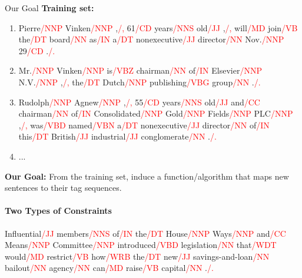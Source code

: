 Our Goal
  \textbf{Training set:}
  \begin{enumerate}
    \item Pierre\textcolor{red}{/NNP} Vinken\textcolor{red}{/NNP} ,\textcolor{red}{/,} 61\textcolor{red}{/CD} years\textcolor{red}{/NNS} old\textcolor{red}{/JJ} ,\textcolor{red}{/,} will\textcolor{red}{/MD} join\textcolor{red}{/VB} the\textcolor{red}{/DT} board\textcolor{red}{/NN} as\textcolor{red}{/IN} a\textcolor{red}{/DT} nonexecutive\textcolor{red}{/JJ} director\textcolor{red}{/NN} Nov.\textcolor{red}{/NNP} 29\textcolor{red}{/CD} .\textcolor{red}{/.}
    \item Mr.\textcolor{red}{/NNP} Vinken\textcolor{red}{/NNP} is\textcolor{red}{/VBZ} chairman\textcolor{red}{/NN} of\textcolor{red}{/IN} Elsevier\textcolor{red}{/NNP} N.V.\textcolor{red}{/NNP} ,\textcolor{red}{/,} the\textcolor{red}{/DT} Dutch\textcolor{red}{/NNP} publishing\textcolor{red}{/VBG} group\textcolor{red}{/NN} .\textcolor{red}{/.}
    \item Rudolph\textcolor{red}{/NNP} Agnew\textcolor{red}{/NNP} ,\textcolor{red}{/,} 55\textcolor{red}{/CD} years\textcolor{red}{/NNS} old\textcolor{red}{/JJ} and\textcolor{red}{/CC} chairman\textcolor{red}{/NN} of\textcolor{red}{/IN} Consolidated\textcolor{red}{/NNP} Gold\textcolor{red}{/NNP} Fields\textcolor{red}{/NNP} PLC\textcolor{red}{/NNP} ,\textcolor{red}{/,} was\textcolor{red}{/VBD} named\textcolor{red}{/VBN} a\textcolor{red}{/DT} nonexecutive\textcolor{red}{/JJ} director\textcolor{red}{/NN} of\textcolor{red}{/IN} this\textcolor{red}{/DT} British\textcolor{red}{/JJ} industrial\textcolor{red}{/JJ} conglomerate\textcolor{red}{/NN} .\textcolor{red}{/.}
    \item ...
  \end{enumerate}

  \textbf{Our Goal:} From the training set, induce a function/algorithm that maps new sentences to their tag sequences.


\paragraph{Two Types of Constraints}
  Influential\textcolor{red}{/JJ} members\textcolor{red}{/NNS} of\textcolor{red}{/IN} the\textcolor{red}{/DT} House\textcolor{red}{/NNP} Ways\textcolor{red}{/NNP} and\textcolor{red}{/CC} Means\textcolor{red}{/NNP} Committee\textcolor{red}{/NNP} introduced\textcolor{red}{/VBD} legislation\textcolor{red}{/NN} that\textcolor{red}{/WDT} would\textcolor{red}{/MD} restrict\textcolor{red}{/VB} how\textcolor{red}{/WRB} the\textcolor{red}{/DT} new\textcolor{red}{/JJ} savings-and-loan\textcolor{red}{/NN} bailout\textcolor{red}{/NN} agency\textcolor{red}{/NN} can\textcolor{red}{/MD} raise\textcolor{red}{/VB} capital\textcolor{red}{/NN} .\textcolor{red}{/.} \vspace{0.5cm}

